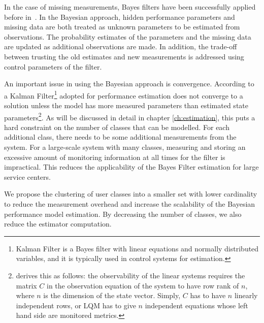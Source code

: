 In the case of missing measurements, Bayes filters have been successfully applied before in~\cite{woodside_use_2005,xu_performance_2005,zheng_tracking_2005}. In the Bayesian approach, hidden performance parameters and missing data are both treated as unknown parameters to be estimated from observations. The probability estimates of the parameters and the missing data are updated as additional observations are made. In addition, the trade-off between trusting the old estimates and new measurements is addressed using control parameters of the filter. 

An important issue in using the Bayesian approach is convergence. 
According to \cite{zheng_performance_2008} a Kalman Filter\cite{watson_kalman_1983}\footnote{Kalman Filter is a Bayes filter with linear equations and normally distributed variables, and it is typically used in control systems for estimation.} adopted for performance estimation does not converge to a solution unless the model has more measured parameters than estimated state parameters\footnote{\cite{zheng_performance_2008} derives this as follows: the observability of the linear systems requires the matrix $C$ in the observation equation of the system to have row rank of $n$, where $n$ is the dimension of the state vector. Simply, $C$ has to have $n$ linearly independent rows, or LQM has to give $n$ independent equations whose left hand side are monitored metrics.}. 
As will be discussed in detail in chapter \ref{ch:estimation}, this puts a hard constraint on the number of classes that can be modelled. 
For each additional class, there needs to be some additional measurements from the system. 
For a large-scale system with many classes, measuring and storing an excessive amount of monitoring information at all times for the filter is impractical.
This reduces the applicability of the Bayes Filter estimation for large service centers.

We propose the clustering of user classes into a smaller set with lower cardinality to reduce the measurement overhead and
increase the scalability of the Bayesian performance model estimation. 
By decreasing the number of classes, we also reduce the estimator computation.

